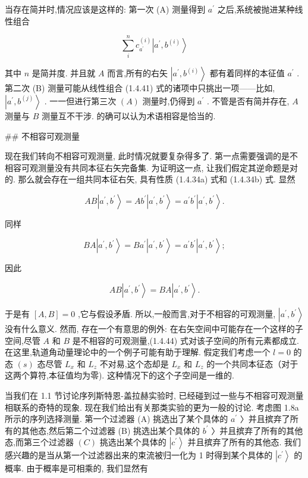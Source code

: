 \documentclass[lang=cn,newtx,10pt,scheme=chinese,thmcnt=section]{elegantbook}
\begin{document}
当存在简并时,情况应该是这样的: 第一次 (A) 测量得到 ${a}^{\prime }$ 之后,系统被抛进某种线性组合

$$
\mathop{\sum }\limits_{i}^{n}{c}_{{a}^{\prime }}^{\left( i\right) }\left| {{a}^{\prime },{b}^{\left( i\right) }}\right\rangle \tag{1.4.41}
$$

其中 $n$ 是简并度. 并且就 $A$ 而言,所有的右矢 $\left| {{a}^{\prime },{b}^{\left( i\right) }}\right\rangle$ 都有着同样的本征值 ${a}^{\prime }$ . 第二次 (B) 测量可能从线性组合 (1.4.41) 式的诸项中只挑出一项——比如, $\left| {{a}^{\prime },{b}^{\left( j\right) }}\right\rangle$ . 一一但进行第三次 $\left( A\right)$ 测量时,仍得到 ${a}^{\prime }$ . 不管是否有简并存在, $A$ 测量与 $B$ 测量互不干涉. 的确可以认为术语相容是恰当的.

## 不相容可观测量

现在我们转向不相容可观测量, 此时情况就要复杂得多了. 第一点需要强调的是不相容可观测量没有共同本征右矢完备集. 为证明这一点, 让我们假定其逆命题是对的. 那么就会存在一组共同本征右矢, 具有性质 (1.4.34a) 式和 (1.4.34b) 式. 显然

$$
{AB}\left| {{a}^{\prime },{b}^{\prime }}\right\rangle = A{b}^{\prime }\left| {{a}^{\prime },{b}^{\prime }}\right\rangle = {a}^{\prime }{b}^{\prime }\left| {{a}^{\prime },{b}^{\prime }}\right\rangle . \tag{1.4.42}
$$

同样

$$
{BA}\left| {{a}^{\prime },{b}^{\prime }}\right\rangle = B{a}^{\prime }\left| {{a}^{\prime },{b}^{\prime }}\right\rangle = {a}^{\prime }{b}^{\prime }\left| {{a}^{\prime },{b}^{\prime }}\right\rangle ; \tag{1.4.43}
$$

因此

$$
{AB}\left| {{a}^{\prime },{b}^{\prime }}\right\rangle = {BA}\left| {{a}^{\prime },{b}^{\prime }}\right\rangle . \tag{1.4.44}
$$

于是有 $\left\lbrack {A, B}\right\rbrack = 0$ ,它与假设矛盾. 所以,一般而言,对于不相容的可观测量, $\left| {{a}^{\prime },{b}^{\prime }}\right\rangle$ 没有什么意义. 然而, 存在一个有意思的例外: 在右矢空间中可能存在一个这样的子空间,尽管 $A$ 和 $B$ 是不相容的可观测量,(1.4.44) 式对该子空间的所有元素都成立. 在这里,轨道角动量理论中的一个例子可能有助于理解. 假定我们考虑一个 $l = 0$ 的态 $\left( s\right)$ 态尽管 ${L}_{x}$ 和 ${L}_{z}$ 不对易,这个态却是 ${L}_{x}$ 和 ${L}_{z}$ 的一个共同本征态（对于这两个算符,本征值均为零). 这种情况下的这个子空间是一维的.

当我们在 1.1 节讨论序列斯特恩-盖拉赫实验时, 已经碰到过一些与不相容可观测量相联系的奇特的现象. 现在我们给出有关那类实验的更为一般的讨论. 考虑图 1.8a 所示的序列选择测量. 第一个过滤器 (A) 挑选出了某个具体的 ${a}^{\prime }$ 〉并且摈弃了所有的其他态,然后第二个过滤器 (B) 挑选出某个具体的 ${b}^{\prime }$ 〉并且摈弃了所有的其他态,而第三个过滤器 $\left( C\right)$ 挑选出某个具体的 $\left| {c}^{\prime }\right\rangle$ 并且摈弃了所有的其他态. 我们感兴趣的是当从第一个过滤器出来的束流被归一化为 1 时得到某个具体的 $\left| {c}^{\prime }\right\rangle$ 的概率. 由于概率是可相乘的, 我们显然有
\end{document}
